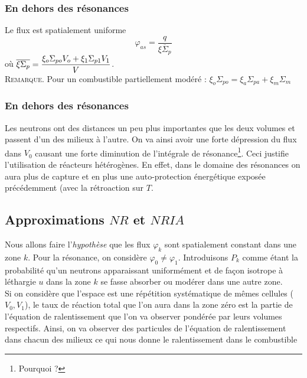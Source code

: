 	\subsubsection{En dehors des résonances}
	Le flux est spatialement uniforme
	\begin{equation}
	{\varphi _{as}} = \dfrac{q}{{\overline {\xi {\Sigma _p}} }}
	\end{equation}
	où $\displaystyle\overline {\xi {\Sigma _p}}  = \frac{{{\xi _o}{\Sigma _{po}}{V_o} + {\xi _1}{\Sigma _{p1}}
	{V_1}}}{V}$. \\
	\textsc{Remarque}. Pour un combustible partiellement modéré : ${\xi _o}{\Sigma _{po}} = {\xi _a}
	{\Sigma _{pa}} + {\xi _m}{\Sigma _m}$
	
	\subsubsection{En dehors des résonances}
	Les neutrons ont des distances un peu plus importantes que les deux volumes et passent d'un des
	milieux à l'autre. On va ainsi avoir une forte dépression du flux dans $V_0$ causant une forte
	diminution de l'intégrale de résonance\footnote{Pourquoi ?}. Ceci justifie l'utilisation de 
	réacteurs hétérogènes. En effet, dans le domaine des résonances on aura plus de capture et en 
	plus une auto-protection énergétique exposée précédemment (avec la rétroaction sur $T$.
	
	
	\subsection{Approximations $NR$ et $NRIA$}
	Nous allons faire l'\textit{hypothèse} que les flux $\varphi_k$ sont spatialement constant 
	dans une zone $k$. Pour la résonance, on considère $\varphi_0\neq\varphi_1$. Introduisons 
	$P_k$ comme étant la probabilité qu'un neutrons apparaissant uniformément et de façon 
	isotrope à léthargie $u$ dans la zone $k$ se fasse absorber ou modérer dans une autre zone. \\
	
	Si on considère que l'espace est une répétition systématique de mêmes cellules ($V_0, V_1$), le
	taux de réaction total que l'on aura dans la zone zéro est la partie de l'équation de 
	ralentissement que l'on va observer pondérée par leurs volumes respectifs. Ainsi, on va 
	observer des particules de l'équation de ralentissement dans chacun des milieux ce qui nous 
	donne le ralentissement dans le combustible\\
	
